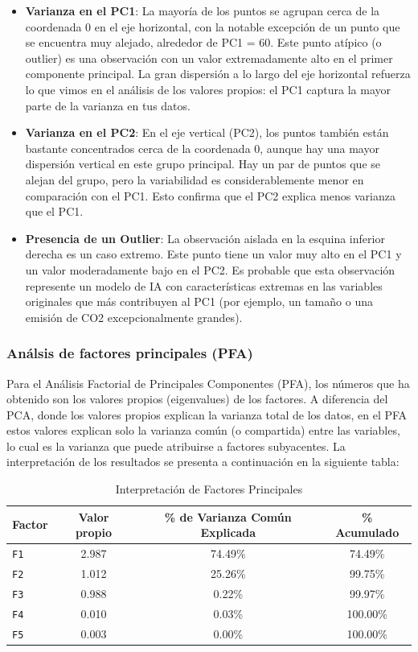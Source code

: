 \documentclass[journal]{IEEEtran}
\begin{document}
	\begin{itemize}
		\item \textbf{Varianza en el PC1}: La mayoría de los puntos se agrupan cerca de la coordenada 0 en el eje horizontal, con la notable excepción de un punto que se encuentra muy alejado, alrededor de PC1 = 60. Este punto atípico (o outlier) es una observación con un valor extremadamente alto en el primer componente principal. La gran dispersión a lo largo del eje horizontal refuerza lo que vimos en el análisis de los valores propios: el PC1 captura la mayor parte de la varianza en tus datos.
		\item \textbf{Varianza en el PC2}: En el eje vertical (PC2), los puntos también están bastante concentrados cerca de la coordenada 0, aunque hay una mayor dispersión vertical en este grupo principal. Hay un par de puntos que se alejan del grupo, pero la variabilidad es considerablemente menor en comparación con el PC1. Esto confirma que el PC2 explica menos varianza que el PC1.
		\item \textbf{Presencia de un Outlier}:  La observación aislada en la esquina inferior derecha es un caso extremo. Este punto tiene un valor muy alto en el PC1 y un valor moderadamente bajo en el PC2. Es probable que esta observación represente un modelo de IA con características extremas en las variables originales que más contribuyen al PC1 (por ejemplo, un tamaño o una emisión de CO2 excepcionalmente grandes).
	\end{itemize}

	\subsubsection{Análsis de factores principales (PFA)}
	Para el Análisis Factorial de Principales Componentes (PFA), los números que ha obtenido son los valores propios (eigenvalues) de los factores. A diferencia del PCA, donde los valores propios explican la varianza total de los datos, en el PFA estos valores explican solo la varianza común (o compartida) entre las variables, lo cual es la varianza que puede atribuirse a factores subyacentes.
	La interpretación de los resultados se presenta a continuación en la siguiente tabla:
	\begin{table}[H]
		\centering
		\caption{Interpretación de Factores Principales}
		\begin{tabular}{l c c c}
			\toprule
			Factor & Valor propio & \% de Varianza Común Explicada & \% Acumulado	 \\
			\midrule
			\texttt{F1} & 2.987 &    74.49\% & 74.49\%  \\
			\texttt{F2} & 1.012 &    25.26\% & 99.75\%  \\
			\texttt{F3} & 0.988 &    0.22\%  & 99.97\%   \\
			\texttt{F4} & 0.010 &    0.03\%  & 100.00\%   \\
			\texttt{F5} & 0.003 &    0.00\%  & 100.00\%  \\
			\bottomrule
		\end{tabular}
		\label{tab:pca_results}
	\end{table}
\end{document}
